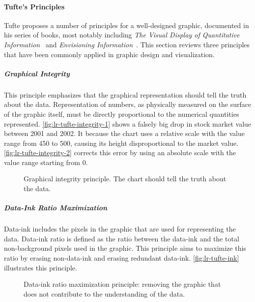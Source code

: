 \paragraph{Tufte's Principles}
Tufte proposes a number of principles for a well-designed graphic, documented in his series of books, most notably including \emph{The Visual Display of Quantitative Information}~\cite{Tufte1983} and \emph{Envisioning Information}~\cite{Tufte1990}. This section reviews three principles that have been commonly applied in graphic design and visualization.

\subparagraph{Graphical Integrity}
This principle emphasizes that the graphical representation should tell the truth about the data. Representation of numbers, as physically measured on the surface of the	graphic	itself,	must be directly proportional to the numerical quantities represented. \autoref{fig:lr-tufte-integrity-1} shows a falsely big drop in stock market value between 2001 and 2002. It because the chart uses a relative scale with the value range from 450 to 500, causing its height disproportional to the market value. \autoref{fig:lr-tufte-integrity-2} corrects this error by using an absolute scale with the value range starting from 0.

\begin{figure}[!htb]
	\centering
	\hfill
	\caption{Graphical integrity principle. The chart should tell the truth about the data.}
	\label{fig:lr-tufte-integrity}
\end{figure}

\subparagraph{Data-Ink Ratio Maximization}
Data-ink includes the pixels in the graphic that are used for representing the data. Data-ink ratio is defined as the ratio between the data-ink and the total non-background pixels used in the graphic. This principle aims to maximize this ratio by erasing non-data-ink and erasing redundant data-ink. \autoref{fig:lr-tufte-ink} illustrates this principle.

\begin{figure}[!htb]
	\centering
	\hfill
	\caption{Data-ink ratio maximization principle: removing the graphic that does not contribute to the understanding of the data.}
	\label{fig:lr-tufte-ink}
\end{figure}

